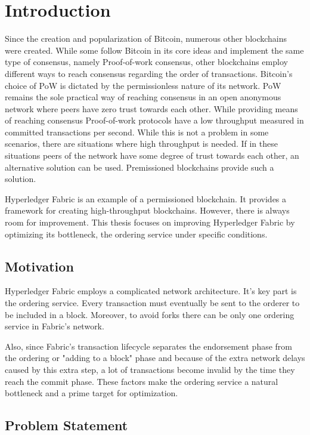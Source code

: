 \chapter{Introduction}
\label{chapter:introduction}

Since the creation and popularization of Bitcoin, numerous other blockchains were created. While some follow Bitcoin in its core ideas and implement the same type of consensus, namely Proof-of-work consensus, other blockchains employ different ways to reach consensus regarding the order of transactions. Bitcoin's choice of PoW is dictated by the permissionless nature of its network. PoW remains the sole practical way of reaching consensus in an open anonymous network where peers have zero trust towards each other. While providing means of reaching consensus Proof-of-work protocols have a low throughput measured in committed transactions per second. While this is not a problem in some scenarios, there are situations where high throughput is needed. If in these situations peers of the network have some degree of trust towards each other, an alternative solution can be used. Premissioned blockchains provide such a solution.

Hyperledger Fabric is an example of a permissioned blockchain. It provides a framework for creating high-throughput blockchains. However, there is always room for improvement. This thesis focuses on improving Hyperledger Fabric by optimizing its bottleneck, the ordering service under specific conditions.

\section{Motivation}
\label{sec:motivation}

Hyperledger Fabric employs a complicated network architecture. It's key part is the ordering service. Every transaction must eventually be sent to the orderer to be included in a block. Moreover, to avoid forks there can be only one ordering service in Fabric's network.

Also, since Fabric's transaction lifecycle separates the endorsement phase from the ordering or "adding to a block" phase and because of the extra network delays caused by this extra step, a lot of transactions become invalid by the time they reach the commit phase. These factors make the ordering service a natural bottleneck and a prime target for optimization.

\section{Problem Statement}
\label{sec:problemStatement}

